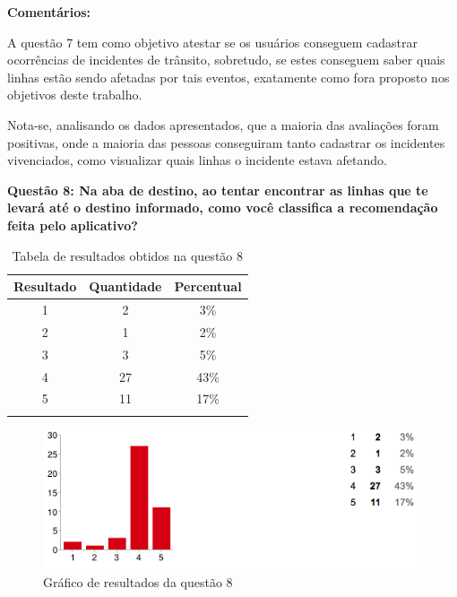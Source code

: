 \textbf{Comentários:}

A questão 7 tem como objetivo atestar se os usuários conseguem cadastrar ocorrências de incidentes de trânsito, sobretudo, se estes conseguem saber quais linhas estão sendo afetadas por tais eventos, exatamente como fora proposto nos objetivos deste trabalho.
	
Nota-se, analisando os dados apresentados, que a maioria das avaliações foram positivas, onde a maioria das pessoas conseguiram tanto cadastrar os incidentes vivenciados, como visualizar quais linhas o incidente estava afetando. \newline

\textbf{Questão 8: Na aba de destino, ao tentar encontrar as linhas que te levará até o destino informado, como você classifica a recomendação feita pelo aplicativo? }

\begin{center}
\begin{longtable}{c|c|c}
\hline
    \multicolumn{1}{c}{\textbf{Resultado}} & \multicolumn{1}{c}{\textbf{Quantidade}} & \multicolumn{1}{c}{\textbf{Percentual}} \\
\hline
    1 & 2 &  3\%\\
    \hline
    2 & 1 & 2\%\\
    \hline
    3 & 3 &  5\%\\
    \hline
    4 & 27 & 43\%\\
    \hline
    5 & 11 & 17\%\\
    \hline
\caption{Tabela de resultados obtidos na questão 8}
\label{tabq8}
\end{longtable}
\end{center}


\begin{figure}[h]
\begin{center}
  \includegraphics[width=16cm]{images/graficos/questao8.png}
  \caption{Gráfico de resultados da questão 8}
  \label{fig:questao8}
\end{center}
\end{figure}

